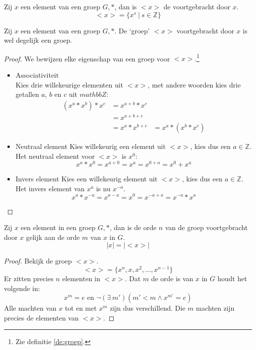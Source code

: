 \documentclass[main.tex]{subfiles}
\begin{document}
\begin{de}
  Zij $x$ een element van een groep $G,*$, dan is $<x>$ de  voortgebracht door $x$.
  \[ <x> = \{ x^{s}\ |\ s \in \mathbb{Z} \} \]
\end{de}

\begin{st}
  \label{st:voortbrenging-is-groep}
  Zij $x$ een element van een groep $G,*$.
  De `groep' $<x>$ voortgebracht door $x$ is wel degelijk een groep.

  \begin{proof}
    We bewijzen elke eigenschap van een groep voor $<x>$.\footnote{Zie definitie \ref{de:groep}.}
    \begin{itemize}
    \item Associativiteit\\
      Kies drie willekeurige elementen uit $<x>$, met andere woorden kies drie getallen $a$, $b$ en $c$ uit $mathbb{Z}$:
      \[
      \begin{array}{rll}
      (x^{a} * x^{b})* x^{c} &= x^{a+b} * x^{c} &\\
                           &= x^{a+b+c}       &\\
                           &= x^{a} * x^{b+c} &= x^{a} * (x^{b} * x^{c})
      \end{array}
      \]
    \item Neutraal element
      Kies willekeurig een element uit $<x>$, kies dus een $a\in \mathbb{Z}$.
      Het neutraal element voor $<x>$ is $x^{0}$:
      \[ x^{a} * x^{0} = x^{a+0} = x^{a} = x^{0+a} = x^{0} + x^{a} \]
    \item Invers element
      Kies een willekeurig element uit $<x>$, kies dus een $a \in \mathbb{Z}$.
      Het invers element van $x^{a}$ is nu $x^{-a}$.
      \[ x^{a}*x^{-a} = x^{a-a} = x^{0} = x^{-a+a} = x^{-a} * x^{a} \]
    \end{itemize}
  \end{proof}

\end{st}

\begin{st}
  \label{st:orde-van-generator-is-orde-van-groep}
  Zij $x$ een element in een groep $G,*$, dan is de orde $n$ van de groep voortgebracht door $x$ gelijk aan de orde $m$ van $x$ in $G$.
  \[ |x| = |<x>| \]

  \begin{proof}
    Bekijk de groep $<x>$.
    \[ <x> = \{ x^{n}, x,x^{2},\dotsc,x^{n-1}\} \]
    Er zitten precies $n$ elementen in $<x>$.
    Dat $m$ de orde is van $x$ in $G$ houdt het volgende in:
    \[ x^{m} = e \text{ en } \neg (\exists\ m')(m'<m \wedge x^{m'} = e) \]
    Alle machten van $x$ tot en met $x^{m}$ zijn dus verschillend.
    Die $m$ machten zijn precies de elementen van $<x>$.
  \end{proof}
\end{st}
 
\end{document}
